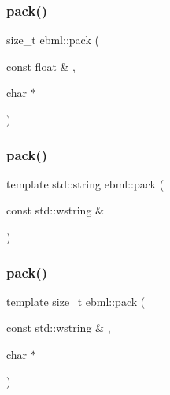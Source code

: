 \mbox{\label{namespaceebml_a9a1c3387186ced48928b78f0404924fd}} 
\subsubsection{\texorpdfstring{pack()}{pack()}\hspace{0.1cm}{\footnotesize\ttfamily [10/24]}}
{\footnotesize\ttfamily size\+\_\+t ebml\+::pack (\begin{DoxyParamCaption}\item[{const float \&}]{,  }\item[{char $\ast$}]{ }\end{DoxyParamCaption})}

\mbox{\label{namespaceebml_ab3177fa4c2fceef733358b336d5792db}} 
\subsubsection{\texorpdfstring{pack()}{pack()}\hspace{0.1cm}{\footnotesize\ttfamily [11/24]}}
{\footnotesize\ttfamily template std\+::string ebml\+::pack (\begin{DoxyParamCaption}\item[{const std\+::wstring \&}]{ }\end{DoxyParamCaption})}

\mbox{\label{namespaceebml_ac0fc71c240d5809912675751dc1644bf}} 
\subsubsection{\texorpdfstring{pack()}{pack()}\hspace{0.1cm}{\footnotesize\ttfamily [12/24]}}
{\footnotesize\ttfamily template size\+\_\+t ebml\+::pack (\begin{DoxyParamCaption}\item[{const std\+::wstring \&}]{,  }\item[{char $\ast$}]{ }\end{DoxyParamCaption})}

\mbox{\label{namespaceebml_a2ee8aa5ba5754b7c9e63da8fce0e413b}} 
